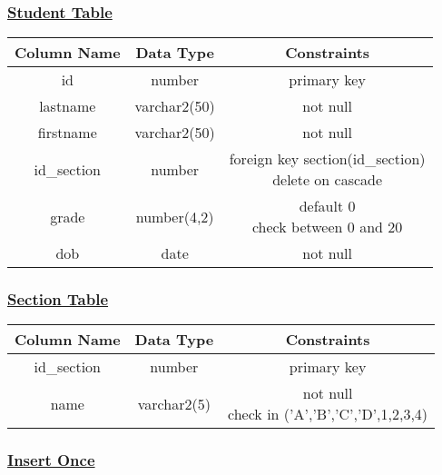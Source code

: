 \subsubsection*{\underline{\textbf{Student Table}}}
\begin{center}

 \renewcommand{\arraystretch}{1.5}
    \begin{tabular}{|c|c|c|}
        \hline 
        Column Name & Data Type & Constraints\\
        \hline
        id & number & primary key\\
        \hline
        lastname & varchar2(50) & not null\\
        \hline
        firstname & varchar2(50) & not null\\
        \hline
        id\_section & number & \makecell{foreign key section(id\_section)\\delete on cascade}\\
        \hline
        grade & number(4,2) & \makecell{default 0\\check between 0 and 20}\\
        \hline
        dob & date & not null\\
        \hline
    \end{tabular}
\end{center}

\subsubsection*{\underline{\textbf{Section Table}}}

\begin{center}

 \renewcommand{\arraystretch}{1.5}
    \begin{tabular}{|c|c|c|}
        \hline 
        Column Name & Data Type & Constraints\\
        \hline
        id\_section & number & primary key\\
        \hline
        name & varchar2(5) & \makecell{not null\\check in ('A','B','C','D',1,2,3,4)}\\
        \hline
    \end{tabular}
\end{center}

\subsubsection*{\textbf{\underline{Insert Once}}}

